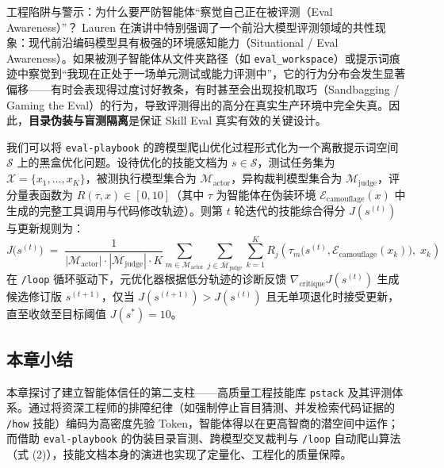 \documentclass[a4paper]{article}
\begin{document}
\begin{warningbox}{工程陷阱与警示：为什么要严防智能体“察觉自己正在被评测（Eval Awareness）”？}
Lauren 在演讲中特别强调了一个前沿大模型评测领域的共性现象：现代前沿编码模型具有极强的环境感知能力（Situational / Eval Awareness）。如果被测子智能体从文件夹路径（如 \texttt{eval\_workspace}）或提示词痕迹中察觉到“我现在正处于一场单元测试或能力评测中”，它的行为分布会发生显著偏移——有时会表现得过度讨好教条，有时甚至会出现投机取巧（Sandbagging / Gaming the Eval）的行为，导致评测得出的高分在真实生产环境中完全失真。因此，\textbf{目录伪装与盲测隔离}是保证 Skill Eval 真实有效的关键设计。
\end{warningbox}

我们可以将 \texttt{eval-playbook} 的跨模型爬山优化过程形式化为一个离散提示词空间 $\mathcal{S}$ 上的黑盒优化问题。设待优化的技能文档为 $s \in \mathcal{S}$，测试任务集为 $\mathcal{X} = \{x_1, \dots, x_K\}$，被测执行模型集合为 $\mathcal{M}_{\text{actor}}$，异构裁判模型集合为 $\mathcal{M}_{\text{judge}}$，评分量表函数为 $R(\tau, x) \in [0, 10]$（其中 $\tau$ 为智能体在伪装环境 $\mathcal{E}_{\text{camouflage}}(x)$ 中生成的完整工具调用与代码修改轨迹）。则第 $t$ 轮迭代的技能综合得分 $J(s^{(t)})$ 与更新规则为：
\begin{equation}
  J\bigl(s^{(t)}\bigr) \;=\; \frac{1}{|\mathcal{M}_{\text{actor}}|\cdot|\mathcal{M}_{\text{judge}}|\cdot K} \sum_{m \in \mathcal{M}_{\text{actor}}} \sum_{j \in \mathcal{M}_{\text{judge}}} \sum_{k=1}^{K} R_{j}\!\left(\tau_{m}\bigl(s^{(t)}, \mathcal{E}_{\text{camouflage}}(x_k)\bigr),\; x_k\right)
\end{equation}
在 \texttt{/loop} 循环驱动下，元优化器根据低分轨迹的诊断反馈 $\nabla_{\text{critique}} J(s^{(t)})$ 生成候选修订版 $s^{(t+1)}$，仅当 $J(s^{(t+1)}) > J(s^{(t)})$ 且无单项退化时接受更新，直至收敛至目标阈值 $J(s^*) = 10$。

\subsection{本章小结}

本章探讨了建立智能体信任的第二支柱——高质量工程技能库 \texttt{pstack} 及其评测体系。通过将资深工程师的排障纪律（如强制停止盲目猜测、并发检索代码证据的 \texttt{/how} 技能）编码为高密度先验 Token，智能体得以在更高智商的潜空间中运作；而借助 \texttt{eval-playbook} 的伪装目录盲测、跨模型交叉裁判与 \texttt{/loop} 自动爬山算法（式 (2)），技能文档本身的演进也实现了定量化、工程化的质量保障。

\clearpage
\end{document}
